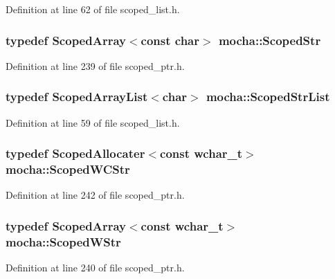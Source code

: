 Definition at line 62 of file scoped\_\-list.h.

\hypertarget{namespacemocha_ac9ec76d00dcf0c61c75a2b998115dc07}{
\subsubsection[{ScopedStr}]{\setlength{\rightskip}{0pt plus 5cm}typedef {\bf ScopedArray}$<$const char$>$ {\bf mocha::ScopedStr}}}
\label{namespacemocha_ac9ec76d00dcf0c61c75a2b998115dc07}


Definition at line 239 of file scoped\_\-ptr.h.

\hypertarget{namespacemocha_a789a9c499e1720de1c98c4a61b2d05c6}{
\subsubsection[{ScopedStrList}]{\setlength{\rightskip}{0pt plus 5cm}typedef {\bf ScopedArrayList}$<$char$>$ {\bf mocha::ScopedStrList}}}
\label{namespacemocha_a789a9c499e1720de1c98c4a61b2d05c6}


Definition at line 59 of file scoped\_\-list.h.

\hypertarget{namespacemocha_a1ff5dcd4de7797a2612a2b290e279058}{
\subsubsection[{ScopedWCStr}]{\setlength{\rightskip}{0pt plus 5cm}typedef {\bf ScopedAllocater}$<$const wchar\_\-t$>$ {\bf mocha::ScopedWCStr}}}
\label{namespacemocha_a1ff5dcd4de7797a2612a2b290e279058}


Definition at line 242 of file scoped\_\-ptr.h.

\hypertarget{namespacemocha_a38514bf0742fae0e0cc6940a4c2e0071}{
\subsubsection[{ScopedWStr}]{\setlength{\rightskip}{0pt plus 5cm}typedef {\bf ScopedArray}$<$const wchar\_\-t$>$ {\bf mocha::ScopedWStr}}}
\label{namespacemocha_a38514bf0742fae0e0cc6940a4c2e0071}


Definition at line 240 of file scoped\_\-ptr.h.

